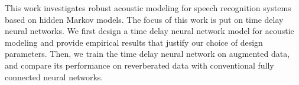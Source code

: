 
\abstract
This work investigates robust acoustic modeling for speech recognition systems based on hidden Markov models. The focus of this work is put on time delay neural networks. We first design a time delay neural network model for acoustic modeling and provide empirical results that justify our choice of design parameters. Then, we train the time delay neural network on augmented data, and compare its performance on reverberated data with conventional fully connected neural networks.